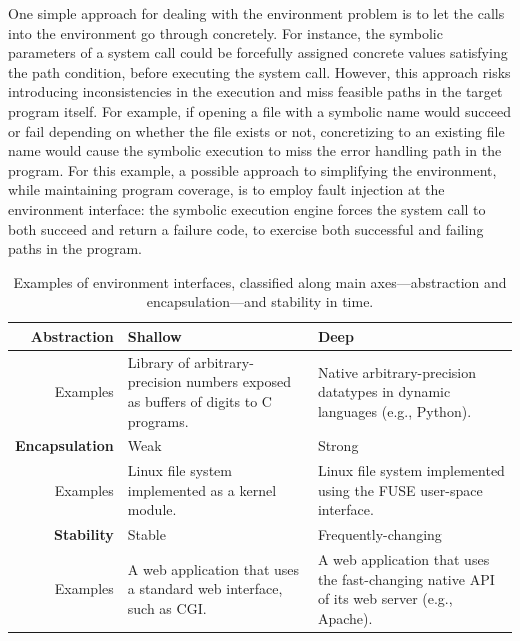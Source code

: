 
One simple approach for dealing with the environment problem is to let the calls into the environment go through concretely.
%
For instance, the symbolic parameters of a system call could be forcefully assigned concrete values satisfying the path condition, before executing the system call.  However, this approach risks introducing inconsistencies in the execution and miss feasible paths in the target program itself.
%
For example, if opening a file with a symbolic name would succeed or fail depending on whether the file exists or not, concretizing to an existing file name would cause the symbolic execution to miss the error handling path in the program.
%
For this example, a possible approach to simplifying the environment, while maintaining program coverage, is to employ fault injection at the environment interface: the symbolic execution engine forces the system call to both succeed and return a failure code, to exercise both successful and failing paths in the program.

\newcommand{\cnineccolor}{\cellcolor{GreenYellow}}
\newcommand{\chefccolor}{\cellcolor{SkyBlue}}

\begin{table}
  \centering
  \small
  \begin{tabular}{r p{6cm} p{6cm}}
    
    \textbf{Abstraction} & Shallow & Deep \\
    \hline
    \bigskip Examples      & Library of arbitrary-precision numbers exposed as buffers of digits to C programs.     & Native arbitrary-precision datatypes in dynamic languages (e.g., Python). \\
    
    \textbf{Encapsulation} & Weak & Strong \\
    \hline
    \bigskip Examples      & Linux file system implemented as a kernel module.   & Linux file system implemented using the FUSE user-space interface. \\
    
    \textbf{Stability}   & Stable    & Frequently-changing \\
    \hline
        Examples          & A web application that uses a standard web interface, such as CGI.    & A web application that uses the fast-changing native API of its web server (e.g., Apache). \\
  \end{tabular}
  \caption{Examples of environment interfaces, classified along main axes---abstraction and encapsulation---and stability in time.
}
  \label{tab:intro:env}
\end{table}

